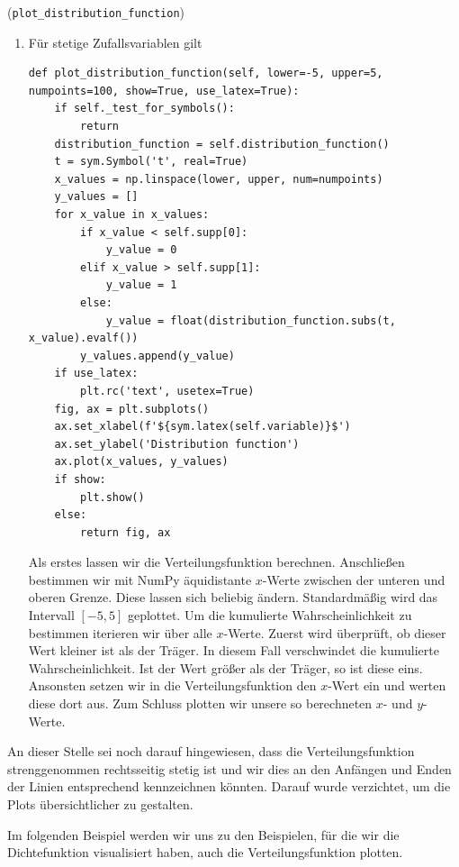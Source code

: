 \begin{Code}{(\lstinline|plot_distribution_function|)}
\begin{enumerate}[label=(\roman*)]
\item Für stetige Zufallsvariablen gilt
\begin{lstlisting}
def plot_distribution_function(self, lower=-5, upper=5, numpoints=100, show=True, use_latex=True):
    if self._test_for_symbols():
        return
    distribution_function = self.distribution_function()
    t = sym.Symbol('t', real=True)
    x_values = np.linspace(lower, upper, num=numpoints)
    y_values = []
    for x_value in x_values:
        if x_value < self.supp[0]:
            y_value = 0
        elif x_value > self.supp[1]:
            y_value = 1
        else:
            y_value = float(distribution_function.subs(t, x_value).evalf())
        y_values.append(y_value)
    if use_latex:
        plt.rc('text', usetex=True)
    fig, ax = plt.subplots()
    ax.set_xlabel(f'${sym.latex(self.variable)}$')
    ax.set_ylabel('Distribution function')
    ax.plot(x_values, y_values)
    if show:
        plt.show()
    else:
        return fig, ax
\end{lstlisting}
Als erstes lassen wir die Verteilungsfunktion berechnen. Anschließen bestimmen wir mit NumPy äquidistante $x$-Werte zwischen der unteren und oberen Grenze. Diese lassen sich beliebig ändern. Standardmäßig wird das Intervall $[-5, 5]$ geplottet. Um die kumulierte Wahrscheinlichkeit zu bestimmen iterieren wir über alle $x$-Werte. Zuerst wird überprüft, ob dieser Wert kleiner ist als der Träger. In diesem Fall verschwindet die kumulierte Wahrscheinlichkeit. Ist der Wert größer als der Träger, so ist diese eins. Ansonsten setzen wir in die Verteilungsfunktion den $x$-Wert ein und werten diese dort aus. Zum Schluss plotten wir unsere so berechneten $x$- und $y$-Werte.
\end{enumerate}
An dieser Stelle sei noch darauf hingewiesen, dass die Verteilungsfunktion strenggenommen rechtsseitig stetig ist und wir dies an den Anfängen und Enden der Linien entsprechend kennzeichnen könnten. Darauf wurde verzichtet, um die Plots übersichtlicher zu gestalten.
\end{Code}

Im folgenden Beispiel werden wir uns zu den Beispielen, für die wir \hyperlink{Bsp:DichteBild}{} die Dichtefunktion visualisiert haben, auch die Verteilungsfunktion plotten.

